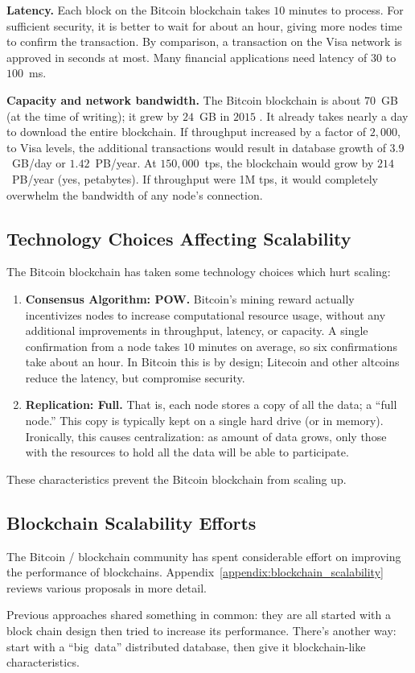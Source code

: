 \medskip
\noindent\textbf{Latency.} Each block on the Bitcoin blockchain takes $10$ minutes to process.
For sufficient security, it is better to wait for about an hour, giving more nodes time to confirm the transaction.
By comparison, a transaction on the Visa network is approved in seconds at most.
Many financial applications need latency of $30$ to $100$~ms.

\medskip
\noindent\textbf{Capacity and network bandwidth.} The Bitcoin blockchain is about $70$~GB (at the time of writing); it grew by $24$~GB in $2015$ \cite{blockchaininfo2015blockchain_size}.
It already takes nearly a day to download the entire blockchain.
If throughput increased by a factor of $2,000$, to Visa levels, the additional transactions would result in database growth of $3.9$~GB/day or $1.42$~PB/year.
At $150,000$~tps, the blockchain would grow by $214$~PB/year (yes, petabytes).
If throughput were 1M tps, it would completely overwhelm the bandwidth of any node’s connection.

\subsection{Technology Choices Affecting Scalability}
The Bitcoin blockchain has taken some technology choices which hurt scaling:
\begin{enumerate}
 \item \textbf{Consensus Algorithm: POW.} Bitcoin’s mining reward actually incentivizes nodes to increase computational resource usage, without any additional improvements in throughput, latency, or capacity. A single confirmation from a node takes $10$ minutes on average, so six confirmations take about an hour. In Bitcoin this is by design; Litecoin and other altcoins reduce the latency, but compromise security.
 \item \textbf{Replication: Full.} That is, each node stores a copy of all the data; a “full node.” This copy is typically kept on a single hard drive (or in memory). Ironically, this causes centralization: as amount of data grows, only those with the resources to hold all the data will be able to participate.
\end{enumerate}

These characteristics prevent the Bitcoin blockchain from scaling up.

\subsection{Blockchain Scalability Efforts}
The Bitcoin / blockchain community has spent considerable effort on improving the performance of blockchains.
Appendix~\ref{appendix:blockchain_scalability} reviews various proposals in more detail.

Previous approaches shared something in common: they are all started with a block chain design then tried to increase its performance.
There’s another way: start with a ``big~data'' distributed database, then give it blockchain-like characteristics.